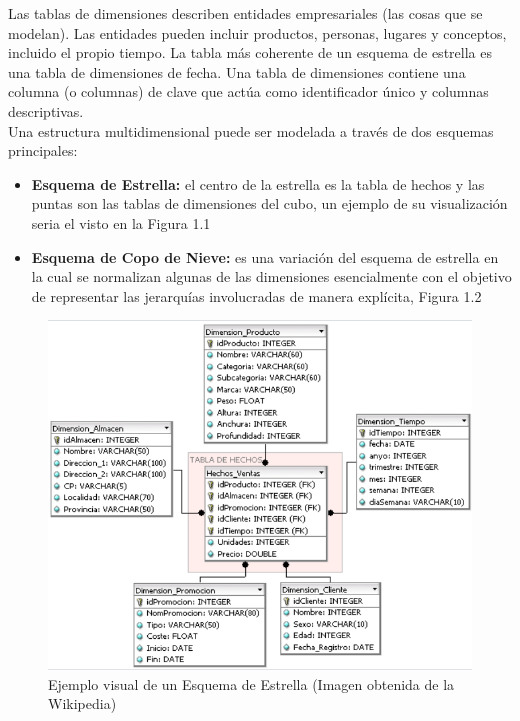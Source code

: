 Las tablas de dimensiones describen entidades empresariales (las cosas que se modelan). Las entidades pueden incluir productos, personas, lugares y conceptos, incluido el propio tiempo. La tabla más coherente de un esquema de estrella es una tabla de dimensiones de fecha. Una tabla de dimensiones contiene una columna (o columnas) de clave que actúa como identificador único y columnas descriptivas.\\

Una estructura multidimensional puede ser modelada a través de dos esquemas principales:

\begin{itemize}
\item \textbf{Esquema de Estrella:} el centro de la estrella es la tabla de hechos y las puntas son las tablas de dimensiones del cubo, un ejemplo de su visualización seria el visto en la Figura 1.1
\item \textbf{Esquema de Copo de Nieve:} es una variación del esquema de estrella en la cual se normalizan algunas de las dimensiones esencialmente con el objetivo de representar las jerarquías involucradas de manera explícita, Figura 1.2
\end{itemize}


\begin{figure}[ht]
  \begin{center}
    \includegraphics[scale=0.35]{Graphics/figura1_1.png}
    \caption{Ejemplo visual de un Esquema de Estrella (Imagen obtenida de la Wikipedia)}
    \label{fig:estrella}
  \end{center}
\end{figure}

